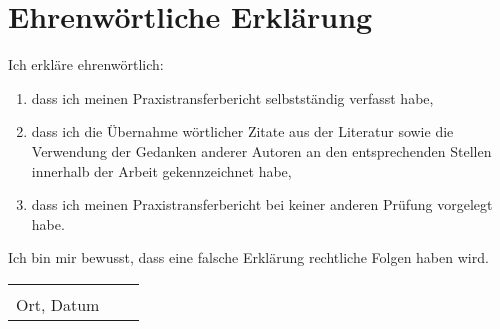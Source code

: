 \chapter*{Ehrenwörtliche Erklärung}


\thispagestyle{empty}

Ich erkläre ehrenwörtlich:
\begin{enumerate}
	\item dass ich meinen Praxistransferbericht selbstständig verfasst habe,
	\item dass ich die Übernahme wörtlicher Zitate aus der Literatur sowie die Verwendung der Gedanken anderer Autoren an den entsprechenden Stellen innerhalb der Arbeit gekennzeichnet habe,
	\item dass ich meinen Praxistransferbericht bei keiner anderen Prüfung vorgelegt habe.
\end{enumerate}
Ich bin mir bewusst, dass eine falsche Erklärung rechtliche Folgen haben wird.

\vspace{2cm}

\begin{tabular}{lp{4em}l}
	\hspace{5cm} &  & \hspace{4cm} \\\cline{1-1}\cline{3-3}
	Ort, Datum   &  & \zStudent
\end{tabular}
